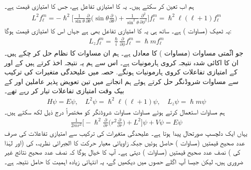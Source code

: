 ہم اب  تعین کر سکتے ہیں۔ یہ  کا امتیازی تفاعل ہے، جس کا امتیازی قیمت  ہے۔
\begin{align*}
L^2 f_{\ell}^m = - \hslash^2 \big [ \frac{1}{\sin \theta} \frac{\partial}{\partial \theta} \big ( \sin \theta \frac{\partial}{\partial \theta} \big ) + \frac{1}{\sin^2 \theta} \frac{\partial^2}{\partial \phi^2} \big ] f_{\ell}^m = \hslash^2 \ell (\ell + 1) f_{\ell}^m
\end{align*}
یہ ٹھیک (مساوات ) ہے۔ ساتھ ہی یہ  کا امتیازی تفاعل بھی ہے جہاں اس کا امتیازی قیمت  ہوگا: 
\begin{align*}
L_z f_{\ell}^m = \frac{\hslash}{i} \frac{\partial}{\partial \phi} f_{\ell}^m = \hslash m f_{\ell}^m
\end{align*}
جو اثّمتی مساوات (مساوات ) کا معادل ہے۔ ہم ان مساوات کا نظام حل کر چکے ہیں۔ ان کا اکائی شدہ نتیجہ کروی ہارمونیات  ہے۔ اس سے ہم یہ نتیجہ اخذ کرتے ہیں کے  اور  کے امتیازی تفاعلات کروی ہارمونیات ہونگے. حصہ  میں علیحدگی متغیرات کی ترکیب سے مساوات شروڈنگر حل کرتے ہوئے ہم انجانے میں تین تعویض پذیر عاملین   اور  کے بیک وقت امتیازی تفاعلات تیار کر رہے تھے۔ 
\begin{align}
H \psi = E \psi , \quad L^2 \psi = \hslash^2 \ell (\ell + 1) \psi , \quad L_z \psi = \hslash m \psi
\end{align}
ہم مساوات  استعمال کرتے ہوئے مساوات مساوات شروڈنگر کو مختصراً درج ذیل لکھ سکتے ہیں۔ 
\begin{align*}
\frac{1}{2m r^2} \big [ - \hslash^2 \frac{\partial}{\partial r} \big ( r^2 \frac{\partial}{\partial r} \big ) + L^2 \big ] \psi + V \psi = E \psi
\end{align*}
یہاں ایک دلچسپ صورتحال پیدا ہوتا ہے۔ علیحدگی متغیرات کی ترکیب سے امتیازی تفاعلات کی صرف عدد صحیح  قیمتیں (مساوات ) حاصل ہوئیں جبکہ زاویائی معیار حرکت کا الجبرائی نظریہ،  کی (اور لہٰذا  کی ) نصف عدد صحیح قیمتیں (مساوات ) دیتی ہے۔ آپ کا خیال ہوگا کہ نصف عدد صحیح نتائج غیر ضروری ہیں، لیکن جیسا آپ اگلے حصوں میں دیکھیں گے، یہ انتہائی زیادہ اہمیت کا حامل نتیجہ ہے۔ 

